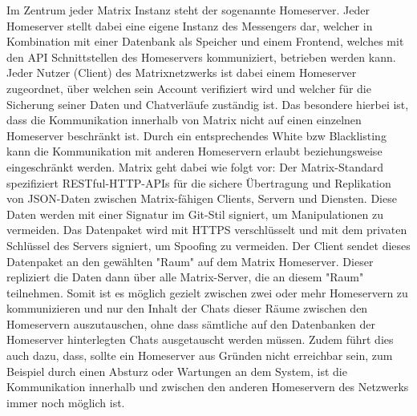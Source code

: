 Im Zentrum jeder Matrix Instanz steht der sogenannte Homeserver. Jeder Homeserver stellt dabei eine eigene Instanz des Messengers dar, welcher in Kombination mit einer Datenbank als Speicher und einem Frontend, welches mit den API Schnittstellen des Homeservers kommuniziert, betrieben werden kann. Jeder Nutzer (Client) des Matrixnetzwerks ist dabei einem Homeserver zugeordnet, über welchen sein Account verifiziert wird und welcher für die Sicherung seiner Daten und Chatverläufe zuständig ist. Das besondere hierbei ist, dass die Kommunikation innerhalb von Matrix nicht auf einen einzelnen Homeserver beschränkt ist. Durch ein entsprechendes White bzw Blacklisting kann die Kommunikation mit anderen Homeservern erlaubt beziehungsweise eingeschränkt werden. Matrix geht dabei wie folgt vor:
Der Matrix-Standard spezifiziert RESTful-HTTP-APIs für die sichere Übertragung und Replikation von JSON-Daten zwischen Matrix-fähigen Clients, Servern und Diensten. Diese Daten werden mit einer Signatur im Git-Stil signiert, um Manipulationen zu vermeiden. Das Datenpaket wird mit HTTPS verschlüsselt und mit dem privaten Schlüssel des Servers signiert, um Spoofing zu vermeiden.
Der Client sendet dieses Datenpaket an den gewählten "Raum" auf dem Matrix Homeserver. Dieser repliziert die Daten dann über alle Matrix-Server, die an diesem "Raum" teilnehmen. Somit ist es möglich gezielt zwischen zwei oder mehr Homeservern zu kommunizieren und nur den Inhalt der Chats dieser Räume zwischen den Homeservern auszutauschen, ohne dass sämtliche auf den Datenbanken der Homeserver hinterlegten Chats ausgetauscht werden müssen. Zudem führt dies auch dazu, dass, sollte ein Homeserver aus Gründen nicht erreichbar sein, zum Beispiel durch einen Absturz oder Wartungen an dem System, ist die Kommunikation innerhalb und zwischen den anderen Homeservern des Netzwerks immer noch möglich ist.

